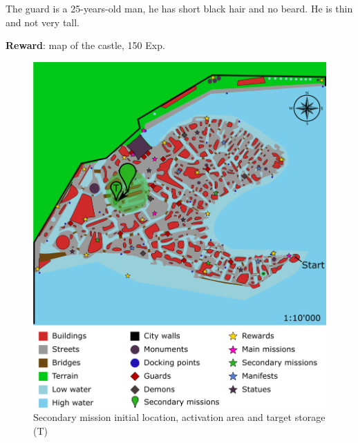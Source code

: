 The guard is a 25-years-old man, he has short black hair and no beard. He is thin and not very tall.

\textbf{Reward}: map of the castle, 150 Exp.

\begin{figure}[H]
  \centering
  \includegraphics[width=\textwidth]{../Images/Maps/dynamiaSecondaryMissions_Guard}
  \caption{Secondary mission initial location, activation area and target storage (T)}
\end{figure}

